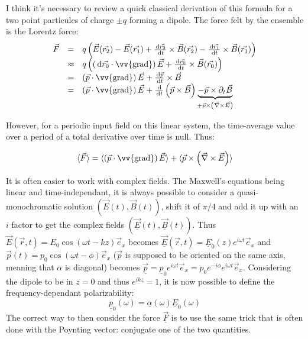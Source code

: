 \documentclass[reprint,amsmath,amssymb,aps,nofootinbib]{revtex4-1}
\renewcommand{\d}{\,\text{d}}
\begin{document}
I think it's necessary to review a quick classical derivation of this formula for a two point particules of charge $\pm q$ forming a dipole. The force felt by the ensemble is the Lorentz force: \[
\begin{array}{llll}
\vec{F}&=&q\left(\vec{E}(\vec{r_{2}})-\vec{E}(\vec{r_{1}})+\frac{\d \vec{r_{2}}}{\d t}\times\vec{B}(\vec{r_{2}})-\frac{\d \vec{r_{1}}}{\d t}\times\vec{B}(\vec{r_{1}})\right) \\
		&\approx & q\left(\left(\d\vec{r_{0}}\cdot\vv{\text{grad}}\right)\vec{E}+\frac{\d\vec{r_{0}}}{\d t}\times\vec{B}(\vec{r_{0}})\right)\\
		&=& \left(\vec{p}\cdot\vv{\text{grad}}\right)\vec{E}+\frac{\d\vec{p}}{\d t}\times\vec{B}\\
        &=& \left(\vec{p}\cdot\vv{\text{grad}}\right)\vec{E}+\frac{\d}{\d t}\left(\vec{p}\times\vec{B}\right)\underbrace{-\vec{p}\times\partial_{t}\vec{B}}_{+\vec{p}\times\left(\vec{\nabla}\times\vec{E}\right)}\\
\end{array}
\]

However, for a periodic input field on this linear system, the time-average value over a period of a total derivative over time is null. Thus:

\[
\langle\vec{F}\rangle=\langle\left(\vec{p}\cdot\vv{\text{grad}}\right)\vec{E}\rangle+\langle\vec{p}\times\left(\vec{\nabla}\times\vec{E}\right)\rangle
\]

It is often easier to work with complex fields. The Maxwell's equations being linear and time-independant, it is always possible to consider a quasi-monochromatic solution $\left(\vec{E}(t),\vec{B}(t)\right)$, shift it of $\pi/4$ and add it up with an $i$ factor to get the complex fields $\left(\underline{\vec{E}}(t),\underline{\vec{B}}(t)\right)$. Thus $\vec{E}(\vec{r},t)=E_{0}\cos(\omega t - kz)\vec{e}_{x}$ becomes $\underline{\vec{E}}(\vec{r},t)=\underline{E}_{0}(z)e^{i\omega t}\vec{e}_{x}$ and $\vec{p}(t)=p_{0}\cos(\omega t -\phi)\vec{e}_{x}$ ($\vec{p}$ is supposed to be oriented on the same axis, meaning that $\alpha$ is diagonal) becomes $\underline{\vec{p}}=\underline{p}_{0}e^{i\omega t}\vec{e}_{x}=p_{0}e^{-i\phi}e^{i\omega t}\vec{e}_{x}$. Considering the dipole to be in $z=0$ and thus $e^{ikz}=1$, it is now possible to define the frequency-dependant polarizability:
\[\underline{p}_{0}(\omega)=\underline{\alpha}(\omega)\underline{E}_{0}(\omega)\]
The correct way to then consider the force $\underline{\vec{F}}$ is to use the same trick that is often done with the Poynting vector: conjugate one of the two quantities.
\end{document}
